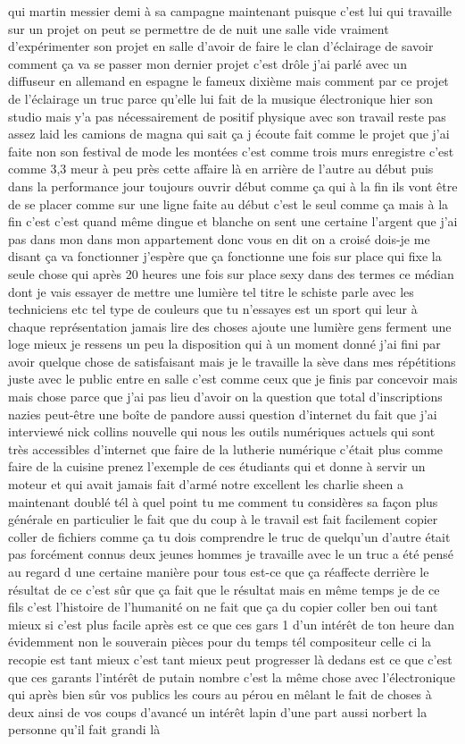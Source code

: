 qui martin messier demi à sa campagne maintenant puisque c'est lui qui travaille sur un projet on peut se permettre de de nuit une salle vide vraiment d'expérimenter son projet en salle d'avoir de faire le clan d'éclairage de savoir comment ça va se passer mon dernier projet c'est drôle j'ai parlé avec un diffuseur en allemand en espagne le fameux dixième mais comment par ce projet de l'éclairage un truc parce qu'elle lui fait de la musique électronique hier son studio mais y'a pas nécessairement de positif physique avec son travail reste pas assez laid les camions de magna qui sait ça j écoute fait comme le projet que j'ai faite non son festival de mode les montées c'est comme trois murs enregistre c'est comme 3,3 meur à peu près cette affaire là en arrière de l'autre au début puis dans la performance jour toujours ouvrir début comme ça qui à la fin ils vont être de se placer comme sur une ligne faite au début c'est le seul comme ça mais à la fin c'est c'est quand même dingue et blanche on sent une certaine l'argent que j'ai pas dans mon dans mon appartement donc vous en dit on a croisé dois-je me disant ça va fonctionner j'espère que ça fonctionne une fois sur place qui fixe la seule chose qui après 20 heures une fois sur place sexy dans des termes ce médian dont je vais essayer de mettre une lumière tel titre le schiste parle avec les techniciens etc tel type de couleurs que tu n'essayes est un sport qui leur à chaque représentation jamais lire des choses ajoute une lumière gens ferment une loge mieux je ressens un peu la disposition qui à un moment donné j'ai fini par avoir quelque chose de satisfaisant mais je le travaille la sève dans mes répétitions juste avec le public entre en salle c'est comme ceux que je finis par concevoir mais mais chose parce que j'ai pas lieu d'avoir on la question que total d'inscriptions nazies peut-être une boîte de pandore aussi question d'internet du fait que j'ai interviewé nick collins nouvelle qui nous les outils numériques actuels qui sont très accessibles d'internet que faire de la lutherie numérique c'était plus comme faire de la cuisine prenez l'exemple de ces étudiants qui et donne à servir un moteur et qui avait jamais fait d'armé notre excellent les charlie sheen a maintenant doublé tél à quel point tu me comment tu considères sa façon plus générale en particulier le fait que du coup à le travail est fait facilement copier coller de fichiers comme ça tu dois comprendre le truc de quelqu'un d'autre était pas forcément connus deux jeunes hommes je travaille avec le un truc a été pensé au regard d une certaine manière pour tous est-ce que ça réaffecte derrière le résultat de ce c'est sûr que ça fait que le résultat mais en même temps je de ce fils c'est l'histoire de l'humanité on ne fait que ça du copier coller ben oui tant mieux si c'est plus facile après est ce que ces gars 1 d'un intérêt de ton heure dan évidemment non le souverain pièces pour du temps tél compositeur celle ci la recopie est tant mieux c'est tant mieux peut progresser là dedans est ce que c'est que ces garants l'intérêt de putain nombre c'est la même chose avec l'électronique qui après bien sûr vos publics les cours au pérou en mêlant le fait de choses à deux ainsi de vos coups d'avancé un intérêt lapin d'une part aussi norbert la personne qu'il fait grandi là 